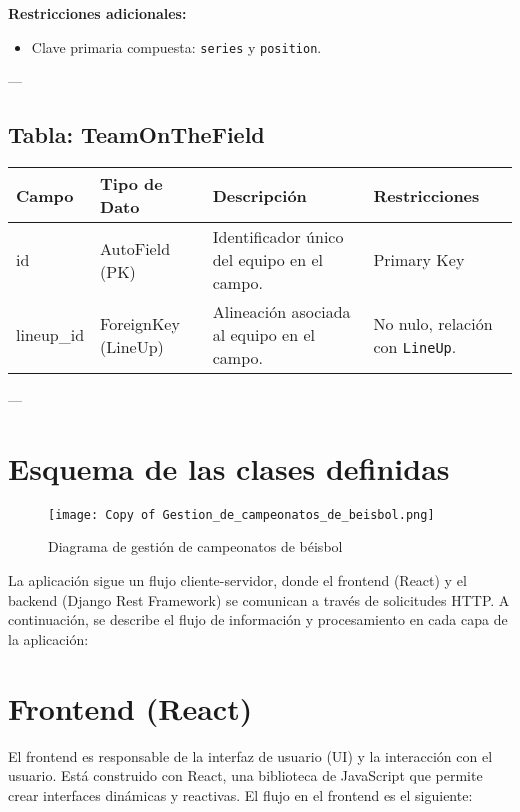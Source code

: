 \documentclass{report}
\begin{document}
    \textbf{Restricciones adicionales:}
    \begin{itemize}
        \item Clave primaria compuesta: \texttt{series} y \texttt{position}.
    \end{itemize}
    
    ---
    
    \subsection*{Tabla: TeamOnTheField}
    \begin{tabular}{|>{\raggedright\arraybackslash}p{3cm}|>{\raggedright\arraybackslash}p{3cm}|>{\raggedright\arraybackslash}p{6cm}|>{\raggedright\arraybackslash}p{4cm}|}
        \hline
        \textbf{Campo} & \textbf{Tipo de Dato} & \textbf{Descripción} & \textbf{Restricciones} \\
        \hline
        id & AutoField (PK) & Identificador único del equipo en el campo. & Primary Key \\
        \hline
        lineup\_id & ForeignKey (LineUp) & Alineación asociada al equipo en el campo. & No nulo, relación con \texttt{LineUp}. \\
        \hline
    \end{tabular}
    
    ---
    
    \section*{Esquema de las clases definidas}
    \begin{figure}[h]
        \centering
        \texttt{[image: Copy of Gestion\_de\_campeonatos\_de\_beisbol.png]}
        \caption{Diagrama de gestión de campeonatos de béisbol}
        \label{fig:gestion_campeonatos}
    \end{figure}
    La aplicación sigue un flujo cliente-servidor, donde el frontend (React) y el backend (Django Rest Framework) se comunican a través de solicitudes HTTP. A continuación, se describe el flujo de información y procesamiento en cada capa de la aplicación:

    \section*{Frontend (React)}
    El frontend es responsable de la interfaz de usuario (UI) y la interacción con el usuario. Está construido con React, una biblioteca de JavaScript que permite crear interfaces dinámicas y reactivas. El flujo en el frontend es el siguiente:
    
\end{document}
